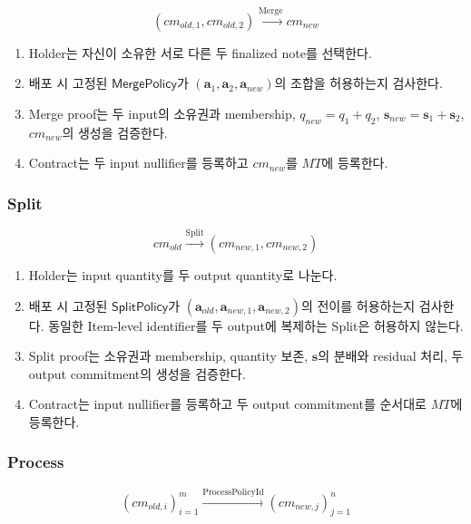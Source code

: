 \documentclass[11pt,a4paper]{extarticle}
\begin{document}
\[
  (cm_{old,1},cm_{old,2})
  \xrightarrow{\mathrm{Merge}}
  cm_{new}
\]

\begin{enumerate}[label=\textbf{\arabic*.},leftmargin=18pt]
  \item Holder는 자신이 소유한 서로 다른 두 finalized note를 선택한다.
  \item 배포 시 고정된 \(\mathsf{MergePolicy}\)가
        \((\mathbf{a}_1,\mathbf{a}_2,\mathbf{a}_{new})\)의 조합을 허용하는지
        검사한다.
  \item Merge proof는 두 input의 소유권과 membership,
        \(q_{new}=q_1+q_2\), \(\mathbf{s}_{new}=\mathbf{s}_1+\mathbf{s}_2\),
        \(cm_{new}\)의 생성을 검증한다.
  \item Contract는 두 input nullifier를 등록하고 \(cm_{new}\)를 \(MT\)에
        등록한다.
\end{enumerate}

\subsubsection*{Split}

\[
  cm_{old}
  \xrightarrow{\mathrm{Split}}
  (cm_{new,1},cm_{new,2})
\]

\begin{enumerate}[label=\textbf{\arabic*.},leftmargin=18pt]
  \item Holder는 input quantity를 두 output quantity로 나눈다.
  \item 배포 시 고정된 \(\mathsf{SplitPolicy}\)가
        \((\mathbf{a}_{old},\mathbf{a}_{new,1},\mathbf{a}_{new,2})\)의
        전이를 허용하는지 검사한다. 동일한 Item-level identifier를 두 output에
        복제하는 Split은 허용하지 않는다.
  \item Split proof는 소유권과 membership, quantity 보존,
        \(\mathbf{s}\)의 분배와 residual 처리, 두 output commitment의 생성을
        검증한다.
  \item Contract는 input nullifier를 등록하고 두 output commitment를 순서대로
        \(MT\)에 등록한다.
\end{enumerate}

\subsubsection*{Process}

\[
  (cm_{old,i})_{i=1}^{m}
  \xrightarrow{\mathrm{ProcessPolicyId}}
  (cm_{new,j})_{j=1}^{n}
\]
\end{document}
